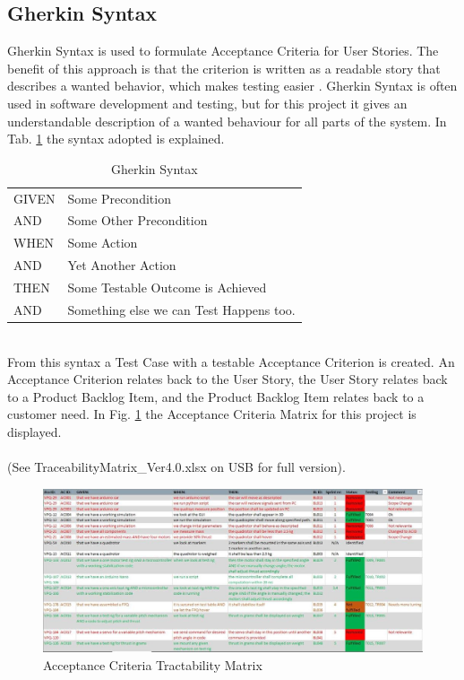 \subsection{Gherkin Syntax}
Gherkin Syntax is used to formulate Acceptance Criteria for User Stories. The benefit of this approach is that the criterion is written as a readable story that describes a wanted behavior, which makes testing easier \cite{ref7}. Gherkin Syntax is often used in software development and testing, but for this project it gives an understandable description of a wanted behaviour for all parts of the system. In Tab. \ref{tab:gherkin} the syntax adopted is explained. 
\begin {table}[h]
    \begin{center}
    \caption {Gherkin Syntax} 
    \label{tab:gherkin} 
    \begin{tabular}{|l|l|}\hline 
\rowcolor{white} GIVEN   &   Some Precondition \\ \rowcolor{gainsboro}
    AND     &   Some Other Precondition        \\
    WHEN    &   Some Action        \\ \rowcolor{gainsboro}
    AND     &   Yet Another Action        \\
    THEN    &   Some Testable Outcome is Achieved       \\ \rowcolor{gainsboro}
    AND    &   Something else we can Test Happens too.   \\
    \hline
    \end{tabular}
    \end{center}
\end{table}
\\
From this syntax a Test Case with a testable Acceptance Criterion is created. An Acceptance Criterion relates back to the User Story, the User Story relates back to a Product Backlog Item, and the Product Backlog Item relates back to a customer need. In Fig. \ref{fig:ACmatrix} the Acceptance Criteria Matrix for this project is displayed. \\\\(See TraceabilityMatrix\_Ver4.0.xlsx on USB for full version).

\begin{figure}[h]
    \centering
        \includegraphics[width=1\textwidth]{VAPIQ-PICTURES/ACmatrix}
        \caption{Acceptance Criteria Tractability Matrix}
        \label{fig:ACmatrix}
\end{figure}


